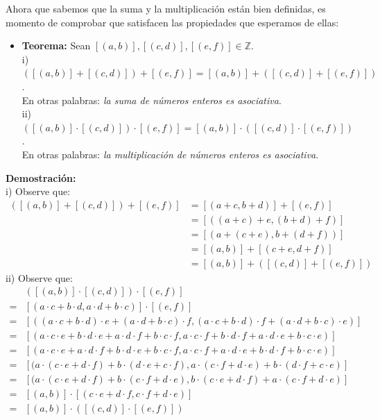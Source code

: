 \documentclass[10 pt]{article}
\begin{document}
\Large{Ahora que sabemos que la suma y la multiplicación están bien definidas, es momento de comprobar que satisfacen las propiedades que esperamos de ellas:} \\

\begin{itemize}
    \item \Large{\textbf{Teorema:} Sean $[(a,b)],[(c,d)],[(e,f)] \in \mathbb Z$. \\

    i) $([(a,b)]+[(c,d)])+[(e,f)]=[(a,b)]+([(c,d)]+[(e,f)])$. \\

    En otras palabras: \textit{la suma de números enteros es asociativa}. \\

    ii) $([(a,b)] \cdot [(c,d)]) \cdot [(e,f)]=[(a,b)] \cdot ([(c,d)] \cdot [(e,f)])$. \\

    En otras palabras: \textit{la multiplicación de números enteros es asociativa}.} \\
\end{itemize}

\Large{\textbf{Demostración:} \\

i) Observe que:}
\begin{align*}
    ([(a,b)]+[(c,d)])+[(e,f)]&=[(a+c,b+d)]+[(e,f)] \\
    &=[((a+c)+e,(b+d)+f)] \\
    &=[(a+(c+e),b+(d+f))] \\
    &=[(a,b)]+[(c+e,d+f)] \\
    &=[(a,b)]+([(c,d)]+[(e,f)])
\end{align*}
\Large{ii) Observe que:}
\begin{align*}
    &([(a,b)] \cdot [(c,d)]) \cdot [(e,f)] \\
    =&[(a \cdot c+b \cdot d,a \cdot d+b \cdot c)] \cdot [(e,f)] \\
    =&[((a \cdot c+b \cdot d) \cdot e+(a \cdot d+b \cdot c) \cdot f,(a \cdot c+b \cdot d) \cdot f+(a \cdot d+b \cdot c) \cdot e)] \\
    =&[(a \cdot c \cdot e+b \cdot d \cdot e+a \cdot d \cdot f+b \cdot c \cdot f,a \cdot c \cdot f+b \cdot d \cdot f+a \cdot d \cdot e+b \cdot c \cdot e)] \\
    =&[(a \cdot c \cdot e+a \cdot d \cdot f+b \cdot d \cdot e+b \cdot c \cdot f,a \cdot c \cdot f+a \cdot d \cdot e+b \cdot d \cdot f+b \cdot c \cdot e)] \\
    =&[(a \cdot (c \cdot e+d \cdot f)+b \cdot (d \cdot e+c \cdot f),a \cdot (c \cdot f+d \cdot e)+b \cdot (d \cdot f+c \cdot e)] \\
    =&[(a \cdot (c \cdot e+d \cdot f)+b \cdot (c \cdot f+d \cdot e),b \cdot (c \cdot e+d \cdot f)+a \cdot (c \cdot f+d \cdot e)] \\
    =&[(a, b)] \cdot [(c \cdot e+d \cdot f,c \cdot f+d \cdot e)] \\
    =&[(a,b)] \cdot ([(c,d)] \cdot [(e,f)]) 
\end{align*}
\end{document}
